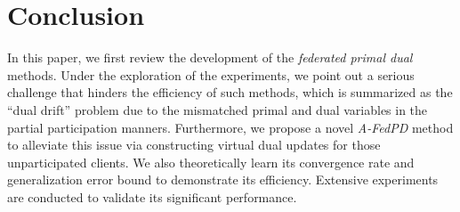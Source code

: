 \section{Conclusion}
\label{conclusion}

In this paper, we first review the development of the \textit{federated primal dual} methods. Under the exploration of the experiments, we point out a serious challenge that hinders the efficiency of such methods, which is summarized as the ``dual drift'' problem due to the mismatched primal and dual variables in the partial participation manners. Furthermore, we propose a novel \textit{A-FedPD} method to alleviate this issue via constructing virtual dual updates for those unparticipated clients. We also theoretically learn its convergence rate and generalization error bound to demonstrate its efficiency. Extensive experiments are conducted to validate its significant performance.